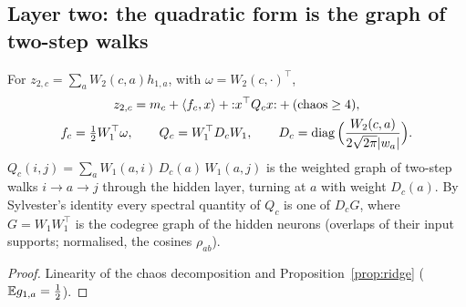 \subsection{Layer two: the quadratic form is the graph of two-step walks}
\begin{theorem}\label{thm:layer2}
For $z_{2,c}=\sum_aW_2(c,a)h_{1,a}$, with $\omega=W_2(c,\cdot)^{\top}$,
\begin{gather*}
z_{2,c}=m_c+\langle f_c,x\rangle+{:}x^{\top}Q_cx{:}+(\text{chaos}\ge4),\\
f_c=\tfrac12W_1^{\top}\omega,\qquad
Q_c=W_1^{\top}D_cW_1,\qquad D_c=\operatorname{diag}\Big(\frac{W_2(c,a)}{2\sqrt{2\pi}|w_a|}\Big).
\end{gather*}
$Q_c(i,j)=\sum_aW_1(a,i)\,D_c(a)\,W_1(a,j)$ is the weighted graph of two-step walks $i\to a\to j$ through the hidden layer,
turning at $a$ with weight $D_c(a)$. By Sylvester's identity every spectral quantity of $Q_c$ is one of $D_cG$, where
$G=W_1W_1^{\top}$ is the codegree graph of the hidden neurons (overlaps of their input supports; normalised, the cosines
$\rho_{ab}$).
\end{theorem}
\begin{proof}
Linearity of the chaos decomposition and Proposition~\ref{prop:ridge} ($\mathbb E g_{1,a}=\tfrac12$).
\end{proof}


